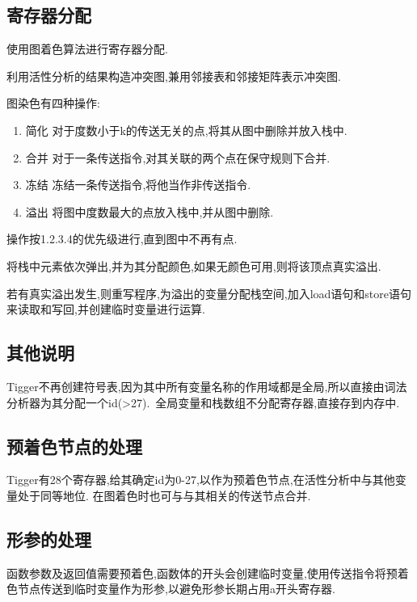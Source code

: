 \documentclass[UTF8]{article}
\begin{document}
\subsection{寄存器分配}
使用图着色算法进行寄存器分配.

利用活性分析的结果构造冲突图,兼用邻接表和邻接矩阵表示冲突图.

图染色有四种操作:
\begin{enumerate}[1.]
\item 简化 对于度数小于k的传送无关的点,将其从图中删除并放入栈中.

\item 合并 对于一条传送指令,对其关联的两个点在保守规则下合并.

\item 冻结 冻结一条传送指令,将他当作非传送指令.

\item 溢出 将图中度数最大的点放入栈中,并从图中删除.
\end{enumerate}
操作按1.2.3.4的优先级进行,直到图中不再有点.

将栈中元素依次弹出,并为其分配颜色,如果无颜色可用,则将该顶点真实溢出.

若有真实溢出发生,则重写程序,为溢出的变量分配栈空间,加入load语句和store语句来读取和写回,并创建临时变量进行运算.
\subsection{其他说明}
Tigger不再创建符号表,因为其中所有变量名称的作用域都是全局,所以直接由词法分析器为其分配一个id(>27).\
全局变量和栈数组不分配寄存器,直接存到内存中.
\subsection{预着色节点的处理}
Tigger有28个寄存器,给其确定id为0-27,以作为预着色节点,在活性分析中与其他变量处于同等地位. 在图着色时也可与与其相关的传送节点合并.
\subsection{形参的处理}
函数参数及返回值需要预着色,函数体的开头会创建临时变量,使用传送指令将预着色节点传送到临时变量作为形参,以避免形参长期占用a开头寄存器.
\end{document}
